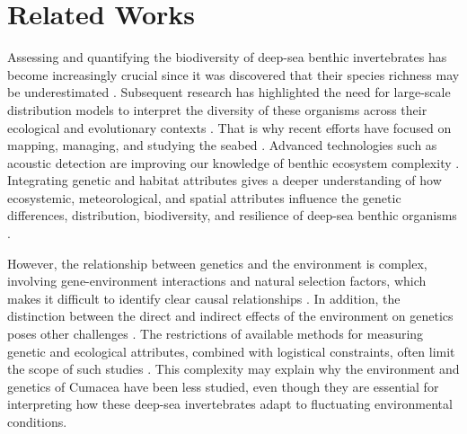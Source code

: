 \section{Related Works}\label{related-works}
Assessing and quantifying the biodiversity of deep-sea benthic invertebrates has become increasingly crucial since it was discovered that their species richness may be underestimated \citep{grassle1992deep}. Subsequent research has highlighted the need for large-scale distribution models to interpret the diversity of these organisms across their ecological and evolutionary contexts \citep{rex1997large}. That is why recent efforts have focused on mapping, managing, and studying the seabed \citep{brown2011benthic}. Advanced technologies such as acoustic detection are improving our knowledge of benthic ecosystem complexity \citep{brown2011benthic}. Integrating genetic and habitat attributes gives a deeper understanding of how ecosystemic, meteorological, and spatial attributes influence the genetic differences, distribution, biodiversity, and resilience of deep-sea benthic organisms \citep{vrijenhoek2009cryptic}.

However, the relationship between genetics and the environment is complex, involving gene-environment interactions and natural selection factors, which makes it difficult to identify clear causal relationships \citep{balkenhol_identifying_2009}. In addition, the distinction between the direct and indirect effects of the environment on genetics poses other challenges \citep{manel_perspectives_2010, balkenhol_landscape_2019}. The restrictions of available methods for measuring genetic and ecological attributes, combined with logistical constraints, often limit the scope of such studies \citep{manel_perspectives_2010, shafer_widespread_2013}. This complexity may explain why the environment and genetics of Cumacea have been less studied, even though they are essential for interpreting how these deep-sea invertebrates adapt to fluctuating environmental conditions.

